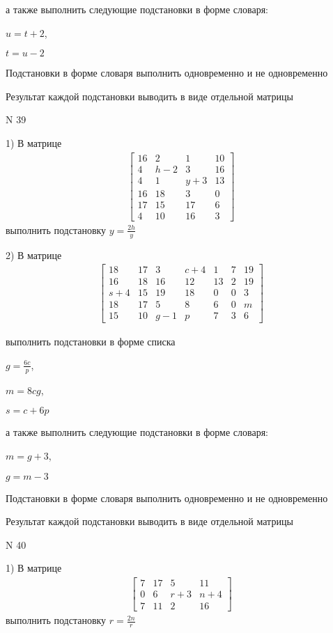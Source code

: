 \documentclass[11pt]{report}
\begin{document}
а также выполнить следующие подстановки в форме словаря:

$u=t + 2$,

$t=u - 2$


    Подстановки в форме словаря выполнить одновременно и не одновременно


    Результат каждой подстановки выводить в виде отдельной матрицы

\newpage
N 39


    1) В матрице
\begin{align*}
\left[\begin{matrix}16 & 2 & 1 & 10\\4 & h - 2 & 3 & 16\\4 & 1 & y + 3 & 13\\16 & 18 & 3 & 0\\17 & 15 & 17 & 6\\4 & 10 & 16 & 3\end{matrix}\right]
\end{align*}
выполнить подстановку $y=\frac{2 h}{y}$


    2) В матрице
\begin{align*}
\left[\begin{matrix}18 & 17 & 3 & c + 4 & 1 & 7 & 19\\16 & 18 & 16 & 12 & 13 & 2 & 19\\s + 4 & 15 & 19 & 18 & 0 & 0 & 3\\18 & 17 & 5 & 8 & 6 & 0 & m\\15 & 10 & g - 1 & p & 7 & 3 & 6\end{matrix}\right]
\end{align*}

выполнить подстановки в форме списка

$g=\frac{6 c}{p}$,

$m=8 c g$,

$s=c + 6 p$

а также выполнить следующие подстановки в форме словаря:

$m=g + 3$,

$g=m - 3$


    Подстановки в форме словаря выполнить одновременно и не одновременно


    Результат каждой подстановки выводить в виде отдельной матрицы

\newpage
N 40


    1) В матрице
\begin{align*}
\left[\begin{matrix}7 & 17 & 5 & 11\\0 & 6 & r + 3 & n + 4\\7 & 11 & 2 & 16\end{matrix}\right]
\end{align*}
выполнить подстановку $r=\frac{2 n}{r}$
\end{document}
